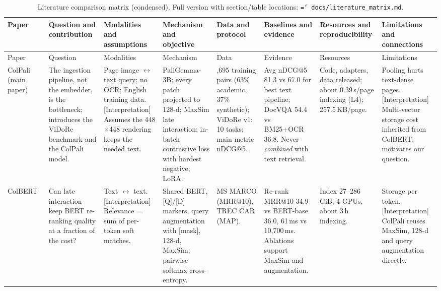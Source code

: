 \documentclass[11pt,a4paper]{article}
\newcommand{\lbl}[2]{\textsf{\scriptsize\textcolor{#1}{[#2]}}}
\newcommand{\Int}{\lbl{tagI}{Interpretation}}
\newcommand{\file}[1]{\texttt{\small\hyphenchar\font=`\/ #1}}
\begin{document}
\begin{landscape}
\footnotesize
\setlength{\tabcolsep}{3pt}
\renewcommand{\arraystretch}{1.15}
\begin{longtable}{>{\raggedright\arraybackslash}p{2.1cm}>{\raggedright\arraybackslash}p{2.9cm}>{\raggedright\arraybackslash}p{2.4cm}>{\raggedright\arraybackslash}p{3.1cm}>{\raggedright\arraybackslash}p{2.9cm}>{\raggedright\arraybackslash}p{3.3cm}>{\raggedright\arraybackslash}p{2.6cm}>{\raggedright\arraybackslash}p{3.3cm}}
\caption{Literature comparison matrix (condensed). Full version with section/table locations: \file{docs/literature\_matrix.md}.}\label{tab:matrix}\\
\toprule
Paper & Question and contribution & Modalities and assumptions & Mechanism and objective & Data and protocol & Baselines and evidence & Resources and reproducibility & Limitations and connections\\
\midrule\endfirsthead
\toprule
Paper & Question & Modalities & Mechanism & Data & Evidence & Resources & Limitations\\
\midrule\endhead
ColPali~\cite{colpali} (main paper) &
The ingestion pipeline, not the embedder, is the bottleneck; introduces the ViDoRe benchmark and the ColPali model. &
Page image $\leftrightarrow$ text query; no OCR; English training data. \Int{} Assumes the 448$\times$448 rendering keeps the needed text. &
PaliGemma-3B; every patch projected to 128-d; MaxSim late interaction; in-batch contrastive loss with hardest negative; LoRA. &
118,695 training pairs (63\% academic, 37\% synthetic); ViDoRe v1: 10 tasks; main metric nDCG@5. &
Avg nDCG@5 81.3 vs 67.0 for best text pipeline; DocVQA 54.4 vs BM25+OCR 36.8. Never \emph{combined} with text retrieval. &
Code, adapters, data released; about 0.39\,s/page indexing (L4); 257.5\,KB/page. &
Pooling hurts text-dense pages. \Int{} Multi-vector storage cost inherited from ColBERT; motivates our question.\\
\midrule
ColBERT~\cite{colbert} &
Can late interaction keep BERT re-ranking quality at a fraction of the cost? &
Text $\leftrightarrow$ text. \Int{} Relevance = sum of per-token soft matches. &
Shared BERT, [Q]/[D] markers, query augmentation with [mask], 128-d, MaxSim; pairwise softmax cross-entropy. &
MS MARCO (MRR@10), TREC CAR (MAP). &
Re-rank MRR@10 34.9 vs BERT-base 36.0, 61\,ms vs 10,700\,ms. Ablations support MaxSim and augmentation. &
Index 27--286\,GiB; 4 GPUs, about 3\,h indexing. &
Storage per token. \Int{} ColPali reuses MaxSim, 128-d and query augmentation directly.\\

\end{longtable}
\end{landscape}
\end{document}
